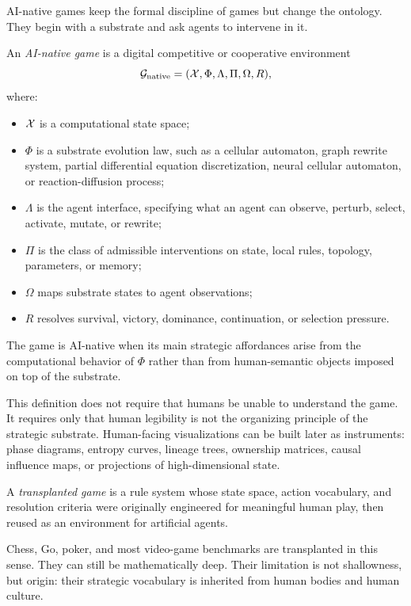 AI-native games keep the formal discipline of games but change the ontology. They begin with a substrate and ask agents to intervene in it.

\begin{definition}\label{def:ai-native-game}
An \emph{AI-native game} is a digital competitive or cooperative environment
\[
  \mathcal{G}_{\mathrm{native}}=(\mathcal{X},\Phi,\Lambda,\Pi,\Omega,R),
\]
where:
\begin{itemize}
  \item $\mathcal{X}$ is a computational state space;
  \item $\Phi$ is a substrate evolution law, such as a cellular automaton, graph rewrite system, partial differential equation discretization, neural cellular automaton, or reaction-diffusion process;
  \item $\Lambda$ is the agent interface, specifying what an agent can observe, perturb, select, activate, mutate, or rewrite;
  \item $\Pi$ is the class of admissible interventions on state, local rules, topology, parameters, or memory;
  \item $\Omega$ maps substrate states to agent observations;
  \item $R$ resolves survival, victory, dominance, continuation, or selection pressure.
\end{itemize}
The game is AI-native when its main strategic affordances arise from the computational behavior of $\Phi$ rather than from human-semantic objects imposed on top of the substrate.
\end{definition}

This definition does not require that humans be unable to understand the game. It requires only that human legibility is not the organizing principle of the strategic substrate. Human-facing visualizations can be built later as instruments: phase diagrams, entropy curves, lineage trees, ownership matrices, causal influence maps, or projections of high-dimensional state.

\begin{definition}\label{def:transplanted-game}
A \emph{transplanted game} is a rule system whose state space, action vocabulary, and resolution criteria were originally engineered for meaningful human play, then reused as an environment for artificial agents.
\end{definition}

Chess, Go, poker, and most video-game benchmarks are transplanted in this sense. They can still be mathematically deep. Their limitation is not shallowness, but origin: their strategic vocabulary is inherited from human bodies and human culture.

